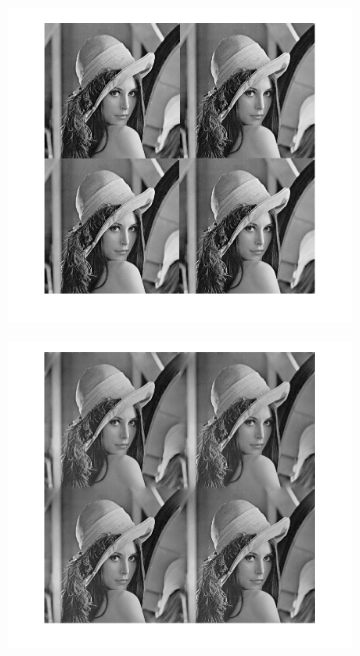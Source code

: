 \documentclass[12pt,a4paper,onecolumn]{article}
\begin{document}
\begin{figure}[H]
	\centering
	\begin{subfigure}[b]{\textwidth}
		\centering
		\includegraphics[height = 0.25\textheight]{per_init}
		\label{fig_11_per_init}
	\end{subfigure}
	\begin{subfigure}[b]{0.4\textwidth}
		\centering
		\includegraphics[height = 0.25\textheight]{per_per}

\end{subfigure}
\end{figure}
\end{document}
